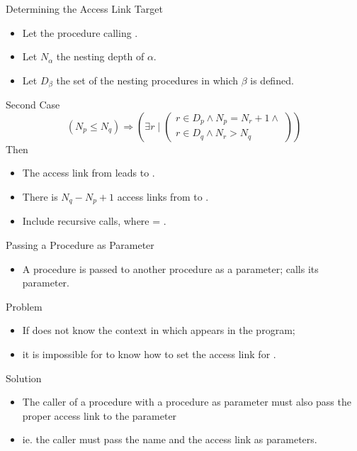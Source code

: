 \begin{bibunit}[apalike]
\begin{frame}[t]{Determining the Access Link Target}
	\begin{small}
	\begin{itemize}
	\item Let the procedure  calling .
	\item Let $N_\alpha$ the nesting depth of $\alpha$.
	\item Let $D_\beta$ the set of the nesting procedures in which $\beta$ is defined.
	\end{itemize}
	\end{small}
	\begin{block}{Second Case}
		\[ \left( N_p \le N_q \right) \Rightarrow \left( \exists r \; \bigg| \; \begin{pmatrix}
			r \in D_p \wedge N_p = N_r + 1 \wedge \\
			r \in D_q \wedge N_r > N_q
			\end{pmatrix} \right) \]
		Then \begin{itemize}
			\item The access link from  leads to .
			\item There is $N_q - N_p + 1$ access links from  to .
			\item Include recursive calls, where  = .
			\end{itemize}
	\end{block}
\end{frame}

\begin{frame}[t]{Passing a Procedure as Parameter}
	\begin{itemize}
	\item A procedure  is passed to another procedure  as a parameter;  calls its parameter.
	\end{itemize}
	\begin{alertblock}{Problem}
		\begin{itemize}
		\item If  does not know the context in which  appears in the program;
		\item it is impossible for  to know how to set the access link for .
		\end{itemize}
	\end{alertblock}
	\begin{block}{Solution}
		\begin{itemize}
		\item The caller of a procedure with a procedure as parameter must also pass the proper access link to the parameter
		\item ie. the caller must pass the name and the access link as parameters.
		\end{itemize}
	\end{block}
\end{frame}


\end{bibunit}
